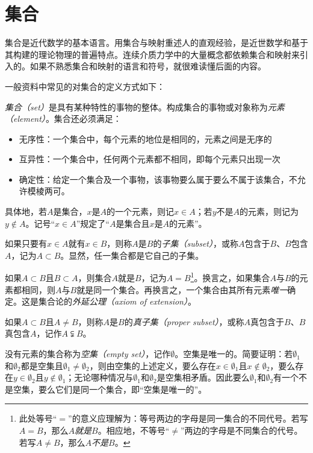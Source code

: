\documentclass[../main.tex]{subfiles}
\begin{document}
\section{集合}
集合是近代数学的基本语言。用集合与映射重述人的直观经验，是近世数学和基于其构建的理论物理的普遍特点。连续介质力学中的大量概念都依赖集合和映射来引入的。如果不熟悉集合和映射的语言和符号，就很难读懂后面的内容。

一般资料中常见的对集合的定义方式如下：

\begin{definition}\label{def:II.1.1}
    \emph{集合（set）}是具有某种特性的事物的整体。构成集合的事物或对象称为\emph{元素（element）}。集合还必须满足：
    \begin{itemize}
        \item 无序性：一个集合中，每个元素的地位是相同的，元素之间是无序的
        \item 互异性：一个集合中，任何两个元素都不相同，即每个元素只出现一次
        \item 确定性：给定一个集合及一个事物，该事物要么属于要么不属于该集合，不允许模棱两可。
    \end{itemize}
\end{definition}

具体地，若$A$是集合，$x$是$A$的一个元素，则记$x\in A$；若$y$不是$A$的元素，则记为$y\notin A$。记号“$x\in A$”规定了“$A$是集合且$x$是$A$的元素”。

如果只要有$x\in A$就有$x\in B$，则称$A$是$B$的\emph{子集（subset）}，或称$A$包含于$B$、$B$包含$A$，记为$A\subset B$。显然，任一集合都是它自己的子集。

如果$A\subset B$且$B\subset A$，则集合$A$就是$B$，记为$A=B$\footnote{此处等号“$=$”的意义应理解为：等号两边的字母是同一集合的不同代号。若写$A=B$，那么$A$\emph{就是}$B$。相应地，不等号“$\neq$”两边的字母是不同集合的代号。若写$A\neq B$，那么$A$\emph{不是}$B$。}。换言之，如果集合$A$与$B$的元素都相同，则$A$与$B$就是同一个集合。再换言之，一个集合由其所有元素\emph{唯一}确定。这是集合论的\emph{外延公理（axiom of extension）}。

如果$A\subset B$且$A\neq B$，则称$A$是$B$的\emph{真子集（proper subset）}，或称$A$真包含于$B$、$B$真包含$A$，记作$A\subsetneqq B$。

没有元素的集合称为\emph{空集（empty set）}，记作$\emptyset$。空集是唯一的。简要证明：若$\emptyset_1$和$\emptyset_2$都是空集且$\emptyset_1\neq\emptyset_2$，则由空集的上述定义，要么存在$x\in\emptyset_1$且$x\notin\emptyset_2$，要么存在$y\in\emptyset_2$且$y\notin\emptyset_1$；无论哪种情况与$\emptyset_1$和$\emptyset_2$是空集相矛盾。因此要么$\emptyset_1$和$\emptyset_2$有一个不是空集，要么它们是同一个集合，即“空集是唯一的”。
\end{document}
